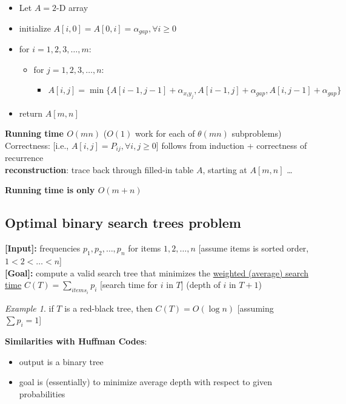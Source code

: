 \documentclass[a4paper,12pt]{article}
\theoremstyle{plain}
\theoremstyle{definition}
\theoremstyle{remark}
\newtheorem*{example}{Example}
\begin{document}
\begin{itemize}
	\item Let $A = 2$-D array
	\item initialize $A[i, 0] = A[0, i] = \alpha_{gap}, \forall i \geq 0$
	\item for $i = 1, 2, 3, \dots, m$:
	\begin{itemize}
		\item for $j = 1, 2, 3, \dots, n$:
		\begin{itemize}
			\item $A[i, j] = \min \{A[i-1, j-1] + \alpha_{x_iy_j}, A[i-1, j] + \alpha_{gap}, A[i, j-1] + \alpha_{gap}\}$
		\end{itemize}
	\end{itemize}
	\item return $A[m, n]$
\end{itemize}

\textbf{Running time $O(mn)$} ($O(1)$ work for each of $\theta(mn)$ subproblems)
\\

Correctness: [i.e., $A[i,j] = P_{ij}, \forall i,j \geq 0$] follows from induction + correctness of recurrence
\\

\textbf{reconstruction}: trace back through filled-in table $A$, starting at $A[m,n]$ \dots

\textbf{Running time is only $O(m+n)$}



\subsection{Optimal binary search trees problem}
\textbf{[Input]:} frequencies $p_1, p_2, \dots, p_n$ for items $1, 2, \dots, n$ [assume items is sorted order, $1 < 2 < \dots < n$]
\\

\textbf{[Goal]:} compute a valid search tree that minimizes the \underline{weighted (average) search time} $C(T) = \sum\limits_{items_i} p_i$ [search time for $i$ in $T$] (depth of $i$ in $T + 1$)

\begin{example} if $T$ is a red-black tree, then $C(T) = O(\log n)$ [assuming $\sum p_i = 1$]\\\end{example}

\textbf{Similarities with Huffman Codes}:
\begin{itemize}
	\item output is a binary tree
	\item goal is (essentially) to minimize average depth with respect to given probabilities
\end{itemize}
\end{document}

